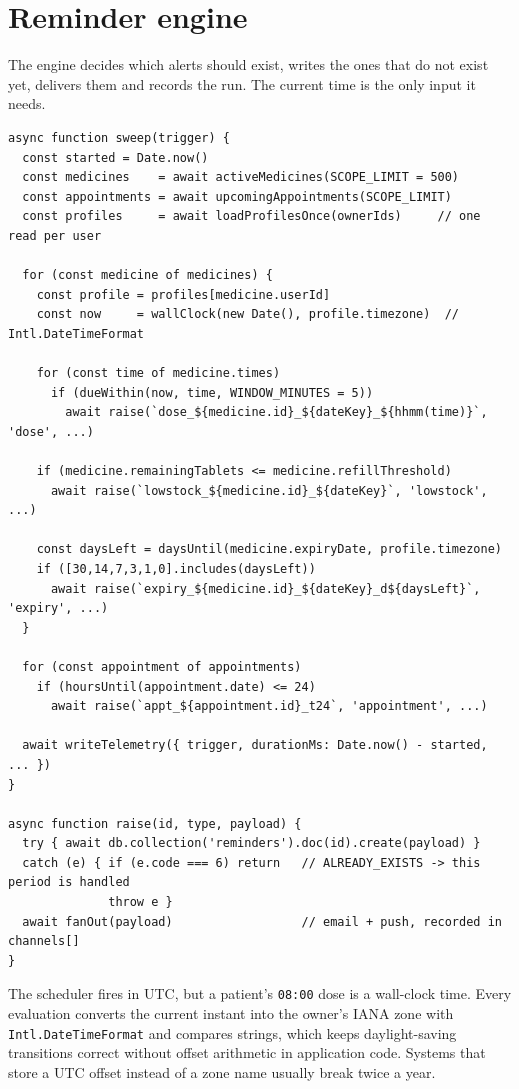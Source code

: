 \documentclass[11pt,a4paper]{report}
\begin{document}
\section{Reminder engine}

The engine decides which alerts should exist, writes the ones that do not exist yet, delivers them and
records the run. The current time is the only input it needs.

\begin{lstlisting}[caption={Sweep algorithm (simplified from \texttt{functions/lib/engine.js}).},label={lst:sweep}]
async function sweep(trigger) {
  const started = Date.now()
  const medicines    = await activeMedicines(SCOPE_LIMIT = 500)
  const appointments = await upcomingAppointments(SCOPE_LIMIT)
  const profiles     = await loadProfilesOnce(ownerIds)     // one read per user

  for (const medicine of medicines) {
    const profile = profiles[medicine.userId]
    const now     = wallClock(new Date(), profile.timezone)  // Intl.DateTimeFormat

    for (const time of medicine.times)
      if (dueWithin(now, time, WINDOW_MINUTES = 5))
        await raise(`dose_${medicine.id}_${dateKey}_${hhmm(time)}`, 'dose', ...)

    if (medicine.remainingTablets <= medicine.refillThreshold)
      await raise(`lowstock_${medicine.id}_${dateKey}`, 'lowstock', ...)

    const daysLeft = daysUntil(medicine.expiryDate, profile.timezone)
    if ([30,14,7,3,1,0].includes(daysLeft))
      await raise(`expiry_${medicine.id}_${dateKey}_d${daysLeft}`, 'expiry', ...)
  }

  for (const appointment of appointments)
    if (hoursUntil(appointment.date) <= 24)
      await raise(`appt_${appointment.id}_t24`, 'appointment', ...)

  await writeTelemetry({ trigger, durationMs: Date.now() - started, ... })
}

async function raise(id, type, payload) {
  try { await db.collection('reminders').doc(id).create(payload) }
  catch (e) { if (e.code === 6) return   // ALREADY_EXISTS -> this period is handled
              throw e }
  await fanOut(payload)                  // email + push, recorded in channels[]
}
\end{lstlisting}

The scheduler fires in UTC, but a patient's \texttt{08:00} dose is a wall-clock time. Every evaluation
converts the current instant into the owner's IANA zone with \texttt{Intl.DateTimeFormat} and compares
strings, which keeps daylight-saving transitions correct without offset arithmetic in application code.
Systems that store a UTC offset instead of a zone name usually break twice a year.
\end{document}
